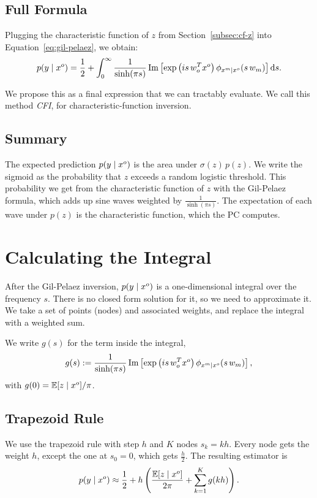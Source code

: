 \subsection{Full Formula}

Plugging the characteristic function of $z$ from Section~\ref{subsec:cf-z} into Equation~\eqref{eq:gil-pelaez}, we obtain:
\[
  p(y \mid x^o) = \frac{1}{2} + \int_0^\infty \frac{1}{\sinh(\pi s)}\, \mathrm{Im} \left[ \exp\left(is\, w_o^T x^o\right) \phi_{x^m \mid x^o}(s\, w_m) \right] \mathrm{d}s.
\]

We propose this as a final expression that we can tractably evaluate. We call this method \emph{CFI}, for characteristic-function inversion.

\subsection{Summary}

The expected prediction $p(y \mid x^o)$ is the area under $\sigma(z)\, p(z)$.
We write the sigmoid as the probability that $z$ exceeds a random logistic threshold. This probability we get from the
characteristic function of $z$ with the Gil-Pelaez formula, which adds up sine waves weighted by $\frac{1}{\sinh(\pi s)}$.
The expectation of each wave under $p(z)$ is the characteristic function, which the PC computes.

\section{Calculating the Integral}
\label{sec:cfi-integral}

After the Gil-Pelaez inversion, $p(y \mid x^o)$ is a one-dimensional integral over the frequency $s$. There is no closed form solution
for it, so we need to approximate it. We take a set of points (nodes) and associated weights, and replace the integral with a weighted sum.

We write $g(s)$ for the term inside the integral,
\[
  g(s) := \frac{1}{\sinh(\pi s)}\, \mathrm{Im} \left[ \exp\left(is\, w_o^T x^o\right) \phi_{x^m \mid x^o}(s\, w_m) \right],
\]
with $g(0) = \mathbb{E}[z \mid x^o] / \pi$.

\subsection{Trapezoid Rule}

We use the trapezoid rule with step $h$ and $K$ nodes $s_k = kh$. Every node gets the weight $h$, except the one at $s_0 = 0$, which gets $\frac{h}{2}$.
The resulting estimator is
\[
  p(y \mid x^o) \approx \frac{1}{2} + h \left( \frac{\mathbb{E}[z \mid x^o]}{2\pi} + \sum_{k=1}^{K} g(kh) \right).
\]

